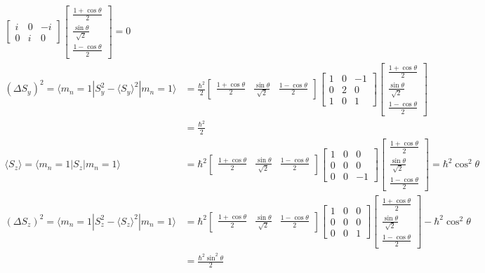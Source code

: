 \documentclass[letter]{article}
\newcommand{\hb}{\hbar}
\begin{document}
\begin{align*}
\begin{bmatrix}
		i & 0 & -i \\ 
	0 & i & 0 \end{bmatrix}  
	\begin{bmatrix} \frac{1 + \cos \theta}{2} \\ \frac{\sin \theta}{\sqrt{2} } \\ 
	\frac{1 - \cos \theta }{2}\end{bmatrix}  = 
0 \\  
(\Delta S_y)^ 2 = 
\langle m_n = 1 | S_y^2 - \langle S_y \rangle ^2 | m_n = 1 \rangle 
				  &= 
\frac{\hb^2}{2} 
	\begin{bmatrix} \frac{1 + \cos \theta}{2} & 
	\frac{\sin \theta}{\sqrt{2}  } & \frac{1- \cos \theta }{2}\end{bmatrix}   
		\begin{bmatrix} 1 & 0 & -1 \\ 
		0 & 2 & 0 \\ 
	1 & 0 & 1 \end{bmatrix}  
	\begin{bmatrix} \frac{1 + \cos \theta}{2} \\ \frac{\sin \theta}{\sqrt{2} } \\ 
	\frac{1 - \cos \theta }{2}\end{bmatrix} 
				  \\
				  &= \frac{\hb^2}{2}\\
	\langle S_z \rangle = \langle m_n = 1 | S_z | m_n = 1 \rangle 
	&= 
	\hb ^2\begin{bmatrix} \frac{1 + \cos \theta}{2} & 
	\frac{\sin \theta}{\sqrt{2}  } & \frac{1- \cos \theta }{2}\end{bmatrix}  
		\begin{bmatrix} 1 & 0 & 0 \\ 
		0 & 0 & 0 \\ 
	0 & 0 & -1 \end{bmatrix}  
	\begin{bmatrix} \frac{1 + \cos \theta}{2} \\ \frac{\sin \theta}{\sqrt{2} } \\ 
	\frac{1 - \cos \theta }{2}\end{bmatrix}  = 
\hb^2 \cos ^2 \theta  \\  
(\Delta S_z)^ 2 = 
\langle m_n = 1 | S_z^2 - \langle S_z \rangle ^2 | m_n = 1 \rangle 
				  &= 
{\hb^2} 
	\begin{bmatrix} \frac{1 + \cos \theta}{2} & 
	\frac{\sin \theta}{\sqrt{2}  } & \frac{1- \cos \theta }{2}\end{bmatrix}   
		\begin{bmatrix} 1 & 0 & 0 \\ 
		0 & 0 & 0 \\ 
	0 & 0 & 1 \end{bmatrix}  
	\begin{bmatrix} \frac{1 + \cos \theta}{2} \\ \frac{\sin \theta}{\sqrt{2} } \\ 
	\frac{1 - \cos \theta }{2}\end{bmatrix}  - \hb^2 \cos ^2 \theta 
				  \\
				  &= \frac{\hb^2 \sin ^2 \theta }{2}\\
\end{align*}
\end{document}
